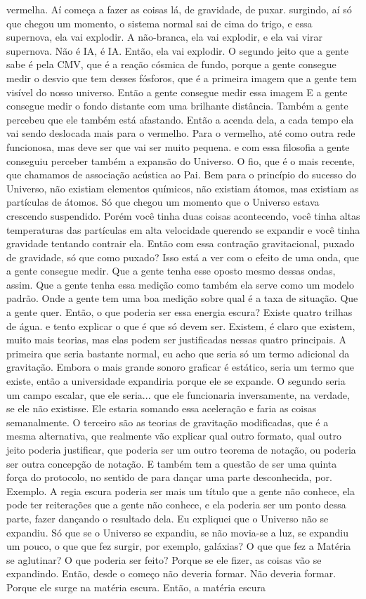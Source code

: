 \documentclass[
	article,			%
	11pt,				%
	twoside,			%
	a4paper,			%
	english,			%
	brazil,				%
	sumario=tradicional
	]{abntex2}
\begin{document}
vermelha. Aí começa a fazer as coisas lá, de gravidade, de puxar. surgindo, aí só que chegou um momento, o sistema normal sai de cima do trigo, e essa supernova, ela vai explodir. A não-branca, ela vai explodir, e ela vai virar supernova. Não é IA, é IA. Então, ela vai explodir. O segundo jeito que a gente sabe é pela CMV, que é a reação cósmica de fundo, porque a gente consegue medir o desvio que tem desses fósforos, que é a primeira imagem que a gente tem visível do nosso universo. Então a gente consegue medir essa imagem E a gente consegue medir o fondo distante com uma brilhante distância. Também a gente percebeu que ele também está afastando. Então a acenda dela, a cada tempo ela vai sendo deslocada mais para o vermelho. Para o vermelho, até como outra rede funcionosa, mas deve ser que vai ser muito pequena. e com essa filosofia a gente conseguiu perceber também a expansão do Universo. O fio, que é o mais recente, que chamamos de associação acústica ao Pai. Bem para o princípio do sucesso do Universo, não existiam elementos químicos, não existiam átomos, mas existiam as partículas de átomos. Só que chegou um momento que o Universo estava crescendo suspendido. Porém você tinha duas coisas acontecendo, você tinha altas temperaturas das partículas em alta velocidade querendo se expandir e você tinha gravidade tentando contrair ela. Então com essa contração gravitacional, puxado de gravidade, só que como puxado? Isso está a ver com o efeito de uma onda, que a gente consegue medir. Que a gente tenha esse oposto mesmo dessas ondas, assim. Que a gente tenha essa medição como também ela serve como um modelo padrão. Onde a gente tem uma boa medição sobre qual é a taxa de situação. Que a gente quer. Então, o que poderia ser essa energia escura? Existe quatro trilhas de água. e tento explicar o que é que só devem ser. Existem, é claro que existem, muito mais teorias, mas elas podem ser justificadas nessas quatro principais. A primeira que seria bastante normal, eu acho que seria só um termo adicional da gravitação. Embora o mais grande sonoro graficar é estático, seria um termo que existe, então a universidade expandiria porque ele se expande. O segundo seria um campo escalar, que ele seria... que ele funcionaria inversamente, na verdade, se ele não existisse. Ele estaria somando essa aceleração e faria as coisas semanalmente. O terceiro são as teorias de gravitação modificadas, que é a mesma alternativa, que realmente vão explicar qual outro formato, qual outro jeito poderia justificar, que poderia ser um outro teorema de notação, ou poderia ser outra concepção de notação. E também tem a questão de ser uma quinta força do protocolo, no sentido de para dançar uma parte desconhecida, por. Exemplo. A regia escura poderia ser mais um título que a gente não conhece, ela pode ter reiterações que a gente não conhece, e ela poderia ser um ponto dessa parte, fazer dançando o resultado dela. Eu expliquei que o Universo não se expandiu. Só que se o Universo se expandiu, se não movia-se a luz, se expandiu um pouco, o que que fez surgir, por exemplo, galáxias? O que que fez a Matéria se aglutinar? O que poderia ser feito? Porque se ele fizer, as coisas vão se expandindo. Então, desde o começo não deveria formar. Não deveria formar. Porque ele surge na matéria escura. Então, a matéria escura 
\end{document}
